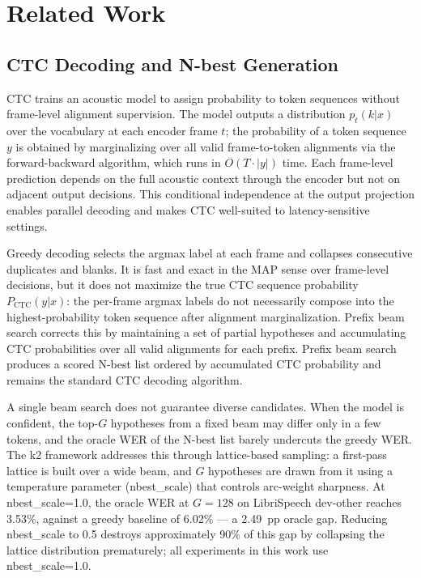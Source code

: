 \section{Related Work}

\subsection{CTC Decoding and N-best Generation}

CTC \cite{graves2006ctc} trains an acoustic model to assign probability to token sequences without frame-level alignment supervision. The model outputs a distribution $p_t(k | x)$ over the vocabulary at each encoder frame $t$; the probability of a token sequence $y$ is obtained by marginalizing over all valid frame-to-token alignments via the forward-backward algorithm, which runs in $O(T \cdot |y|)$ time. Each frame-level prediction depends on the full acoustic context through the encoder but not on adjacent output decisions. This conditional independence at the output projection enables parallel decoding and makes CTC well-suited to latency-sensitive settings.

Greedy decoding selects the argmax label at each frame and collapses consecutive duplicates and blanks. It is fast and exact in the MAP sense over frame-level decisions, but it does not maximize the true CTC sequence probability $P_\text{CTC}(y|x)$: the per-frame argmax labels do not necessarily compose into the highest-probability token sequence after alignment marginalization. Prefix beam search \cite{graves2014towards} corrects this by maintaining a set of partial hypotheses and accumulating CTC probabilities over all valid alignments for each prefix. Prefix beam search produces a scored N-best list ordered by accumulated CTC probability and remains the standard CTC decoding algorithm.

A single beam search does not guarantee diverse candidates. When the model is confident, the top-$G$ hypotheses from a fixed beam may differ only in a few tokens, and the oracle WER of the N-best list barely undercuts the greedy WER. The k2 framework \cite{li2022k2} addresses this through lattice-based sampling: a first-pass lattice is built over a wide beam, and $G$ hypotheses are drawn from it using a temperature parameter (nbest\_scale) that controls arc-weight sharpness. At nbest\_scale=1.0, the oracle WER at $G=128$ on LibriSpeech dev-other reaches 3.53\%, against a greedy baseline of 6.02\% — a 2.49~pp oracle gap. Reducing nbest\_scale to 0.5 destroys approximately 90\% of this gap by collapsing the lattice distribution prematurely; all experiments in this work use nbest\_scale=1.0.

